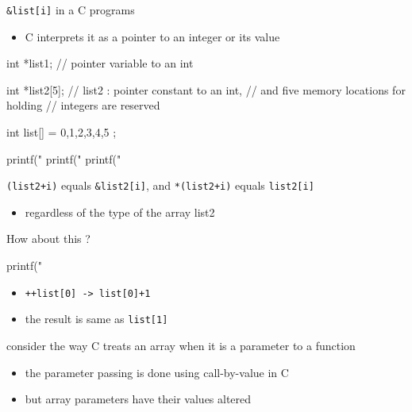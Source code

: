 \documentclass[newPxFont,sthlmFooter,nooffset]{beamer}
\begin{document}
\begin{frame}
\bigskip
\texttt{\&list[i]} in a C programs
\begin{itemize}
\item C interprets it as a pointer to an integer or its value
\end{itemize}

\framebreak

\begin{codedef}
int *list1;          // pointer variable to an int
\end{codedef}

\begin{codedef}
int *list2[5];       // list2 : pointer constant to an int, 
                     // and five memory locations for holding 
                     // integers are reserved
\end{codedef}
\begin{codedef}
int list[] = { 0,1,2,3,4,5 };
	
printf("%
printf("%
printf("%
\end{codedef}
\texttt{(list2+i)} equals \texttt{\&list2[i]}, and \texttt{*(list2+i)} equals \texttt{list2[i]}
\begin{itemize}
\item regardless of the type of the array list2
\end{itemize}

\framebreak

How about this ?
\begin{codedef}
printf("%
\end{codedef}

\begin{itemize}
	\item \texttt{++list[0] -> list[0]+1}
	\item the result is same as \texttt{list[1]}
\end{itemize}

\framebreak

consider the way C treats an array when it is a parameter to a function
\begin{itemize}
\item the parameter passing is done using call-by-value in C
\item but array parameters have their values altered
\end{itemize}

\end{frame}
\end{document}
